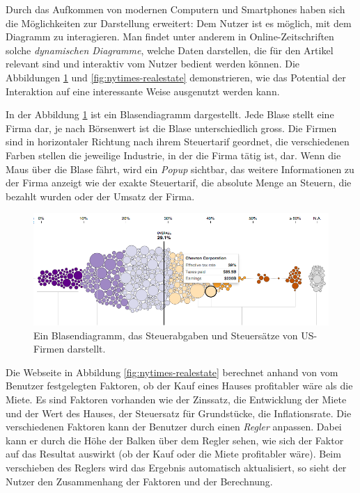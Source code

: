 Durch das Aufkommen von modernen Computern und Smartphones haben sich die Möglichkeiten zur Darstellung erweitert: Dem Nutzer ist es möglich, mit dem Diagramm zu interagieren. Man findet unter anderem in Online-Zeitschriften solche \textit{dynamischen Diagramme}, welche Daten darstellen, die für den Artikel relevant sind und interaktiv vom Nutzer bedient werden können. Die Abbildungen \ref{fig:nytimes-taxes} und \ref{fig:nytimes-realestate} demonstrieren, wie das Potential der Interaktion auf eine interessante Weise ausgenutzt werden kann.

In der Abbildung \ref{fig:nytimes-taxes} ist ein Blasendiagramm dargestellt. Jede Blase stellt eine Firma dar, je nach Börsenwert ist die Blase unterschiedlich gross. Die Firmen sind in horizontaler Richtung nach ihrem Steuertarif geordnet, die verschiedenen Farben stellen die jeweilige Industrie, in der die Firma tätig ist, dar. Wenn die Maus über die Blase fährt, wird ein \textit{Popup} sichtbar, das weitere Informationen zu der Firma anzeigt wie der exakte Steuertarif, die absolute Menge an Steuern, die bezahlt wurden oder der Umsatz der Firma.

\begin{figure}[!htbp]
	\centering
	\includegraphics[width=\linewidth]{images/nytimes-taxes-zugeschnitten}
	\caption[Blasendiagramm in The New York Times]{Ein Blasendiagramm, das Steuerabgaben und Steuersätze von US-Firmen darstellt. \cite{nytimes-taxes}}
	\label{fig:nytimes-taxes}
\end{figure}

Die Webseite in Abbildung \ref{fig:nytimes-realestate} berechnet anhand von vom Benutzer festgelegten Faktoren, ob der Kauf eines Hauses profitabler wäre als die Miete. Es sind Faktoren vorhanden wie der Zinssatz, die Entwicklung der Miete und der Wert des Hauses, der Steuersatz für Grundstücke, die Inflationsrate. Die verschiedenen Faktoren kann der Benutzer durch einen \textit{Regler} anpassen. Dabei kann er durch die Höhe der Balken über dem Regler sehen, wie sich der Faktor auf das Resultat auswirkt (ob der Kauf oder die Miete profitabler wäre). Beim verschieben des Reglers wird das Ergebnis automatisch aktualisiert, so sieht der Nutzer den Zusammenhang der Faktoren und der Berechnung.

